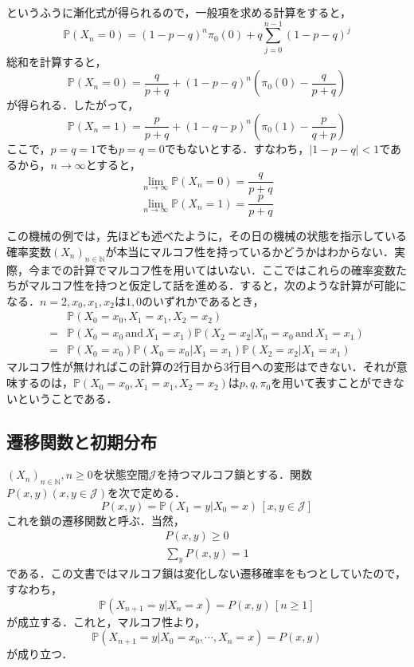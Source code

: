 \documentclass[12pt, a4paper]{jsarticle}
\theoremstyle{definition}
\newcommand{\NN}{{\mathbb{N}}} %
\begin{document}
というふうに漸化式が得られるので，一般項を求める計算をすると，
\begin{equation}
\mathbb{P}(X_n = 0) = (1-p-q)^n\pi_0(0) + q \sum_{j=0}^{n-1}(1-p-q)^j
\end{equation}
総和を計算すると，
\begin{equation}
	\mathbb{P}(X_n = 0) = \frac{q}{p+q} + (1- p- q)^{n} \left( \pi_0(0) - \frac{q}{p+ q} \right) \label{3}
\end{equation}
が得られる．したがって，
\begin{equation}
	\mathbb{P}(X_n = 1) = \frac{p}{p+q} + (1- q- p)^{n} \left( \pi_0(1) - \frac{p}{q+ p} \right) \label{4}
\end{equation}
ここで，$p=q=1$でも$p=q=0$でもないとする．すなわち，$|1-p-q| < 1$であるから，$n \to \infty$とすると，
\[\lim_{n \to \infty} \mathbb{P}(X_n = 0) = \frac{q}{p+q}\]
\[\lim_{n \to \infty} \mathbb{P}(X_n = 1) = \frac{p}{p+q}\]

この機械の例では，先ほども述べたように，その日の機械の状態を指示している確率変数$(X_n)_{n \in \NN}$が本当にマルコフ性を持っているかどうかはわからない．実際，今までの計算でマルコフ性を用いてはいない．ここではこれらの確率変数たちがマルコフ性を持つと仮定して話を進める．すると，次のような計算が可能になる．$n = 2,x_0,x_1,x_2$は$1,0$のいずれかであるとき，
\begin{align*}
	& \mathbb{P}(X_0 = x_0 , X_1 = x_1, X_2 = x_2) \\
	= &\mathbb{P}(X_0 = x_0\, \text{and}\, X_1 = x_1)\mathbb{P}(X_2 = x_2 | X_0 = x_0\, \text{and}\, X_1 = x_1 ) \\
	=&\mathbb{P}(X_0 = x_0)\mathbb{P}(X_0 = x_0| X_1 = x_1)\mathbb{P}(X_2 = x_2 | X_1 = x_1)
\end{align*}
マルコフ性が無ければこの計算の2行目から3行目への変形はできない．それが意味するのは，$\mathbb{P}(X_0 = x_0 , X_1 = x_1, X_2 = x_2)$は$p,q,\pi_0$を用いて表すことができないということである．

\subsection{遷移関数と初期分布}
$(X_{n})_{n \in \NN}, n \ge 0 $を状態空間$\mathcal{J}$を持つマルコフ鎖とする．関数$P(x,y) (x,y \in \mathcal{J})$を次で定める．
\begin{equation}
	P(x,y) = \mathbb{P}(X_1 = y| X_0 = x) \,[x,y \in \mathcal{J}]
\end{equation}
これを鎖の遷移関数と呼ぶ．当然，
\begin{align}
	P(x,y) \ge 0 \label{trans fcn1} \\
	\sum_y P(x,y) = 1 \label{trans fcn2}
\end{align}
である．この文書ではマルコフ鎖は変化しない遷移確率をもつとしていたので，すなわち，
\begin{equation}
	\mathbb{P}(X_{n+1} = y| X_n = x) = P(x,y) \,[n \ge 1]
\end{equation}
が成立する．これと，マルコフ性より，
\begin{equation}
	\mathbb{P}(X_{n+1} = y | X_0 = x_0 , \cdots , X_n = x) = P(x,y)	
\end{equation}
が成り立つ．
\end{document}
